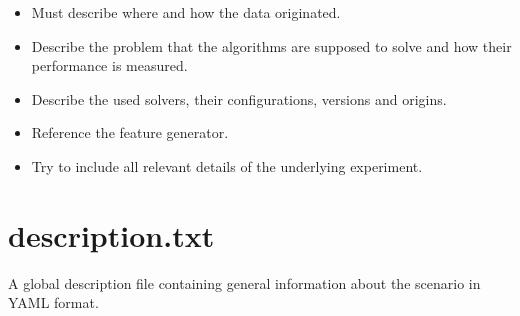 \begin{itemize}
  	\item Must describe where and how the data originated.
    	\item Describe the problem that the algorithms are supposed to solve and how their performance is measured. 
	\item Describe the used solvers, their configurations, versions and origins.
    	\item Reference the feature generator. 
    	\item Try to include all relevant details of the underlying experiment.   
\end{itemize} 


\section{description.txt}

A global description file containing general information about the scenario in
YAML format.

